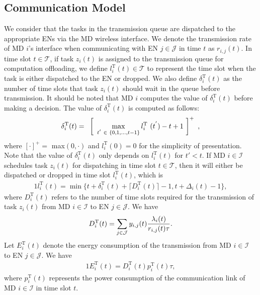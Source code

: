 \documentclass[10pt, journal,letterpaper]{IEEEtran}
\begin{document}
\subsection{Communication Model}
 We consider that the tasks in the transmission queue are dispatched to the appropriate ENs via the MD wireless interface. We denote the transmission rate of MD $i$'s interface when communicating with EN $j \in \mathcal{J}$ in time $t$ as $r_{i,j}(t)$. In time slot $t \in \mathcal{T}$, if task $z_i(t)$ is assigned to the transmission queue for computation offloading, we define $l_i^{\text{T}}(t) \in \mathcal{T}$ to represent the time slot when the task is either dispatched to the EN or dropped. We also define $\delta_i^{\text{T}}(t)$ as the number of time slots that task $z_i(t)$ should wait in the queue before transmission. It should be noted that MD $i$ computes the value of $\delta_i^{\text{T}}(t)$ before making a decision. The value of $\delta_i^{\text{T}}(t)$ is computed as follows:
\begin{alignat}{1}
	\delta_i^{\text{T}}(t) =\textcolor{white}{i} \left[ \textcolor{white}{i}\max\limits_{t^{'}\textcolor{white}{i} \in \textcolor{white}{i} \{0,1,\ldots,t-1\}} l_i^{\text{T}}\textcolor{white}{i}(t^{'})-t+1\textcolor{white}{i}\right]^+\textcolor{white}{i},
	\label{1}  
\end{alignat}
where $[\cdot]^+ =$ max$(0, \cdot)$ and $l_i^{\text{T}}(0)=0$ for the simplicity of presentation. Note that the value of $\delta_i^{\text{T}}(t)$ only depends on $l_i^{\text{T}}(t)$ for $t' < t$. If MD $i \in \mathcal{I}$ schedules task $z_i(t)$ for dispatching in time slot $t \in \mathcal{T}$, then it will either be dispatched or dropped in time slot $l_i^{\text{T}}(t)$, which is
\begin{alignat}{1}
	l_i^{\text{T}}(t) = \min \Big\{t + \delta_i^{\text{T}}(t) + \lceil{D_i^{\text{T}}(t)}\rceil - 1, t + \Delta_i(t) - 1\Big\},
	\label{2}  
\end{alignat}
where $D_i^{\text{T}}(t)$ refers to the number of time slots required for the transmission of task $z_i(t)$ from MD $i \in \mathcal{I}$ to EN $j \in \mathcal{J}$. We have
\begin{alignat}{1}
	D_i^{\text{T}}(t) =  \sum_{j \in \mathcal{J}} y_{i,j}(t) {\lambda_i(t) \over r_{i,j}(t)\tau}.
	\label{3}  
\end{alignat}
Let $E_i^{\text{T}}(t)$ denote the energy consumption of the transmission from MD $i \in \mathcal{I}$ to EN $j \in \mathcal{J}$. We have
\begin{alignat}{1}
	E_i^{\text{T}}(t) = D_i^{\text{T}}(t)p_i^{\text{T}}(t)\tau,
	\label{4}  
\end{alignat}
where $p_i^{\text{T}}(t)$ represents the power consumption of the communication link of MD $i \in \mathcal{I}$ in time slot $t$.
\end{document}
